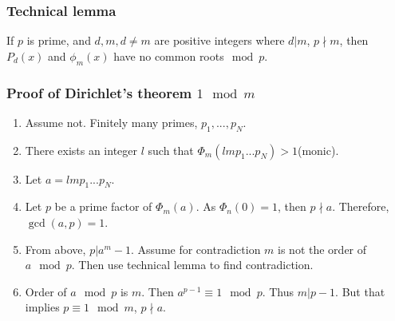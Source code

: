 \documentclass[]{beamer}
\begin{document}
\begin{frame}
	\frametitle{Technical lemma}
	If $p$ is prime, and $d, m, d \neq m$ are positive integers where $d | m$, $p \nmid m$, then $P_d(x)$ and $\phi_m(x)$ have no common roots$\mod p$. 
\end{frame}
\begin{frame}
	\frametitle{Proof of Dirichlet's theorem $1 \mod m$}
	\begin{enumerate}
		\item Assume not. Finitely many primes, $p_1, ..., p_N$.
		\item There exists an integer $l$ such that $\Phi_m(l m p_1 ... p_N) > 1$(monic).
		\item Let $a = l m p_1 ... p_N$. 
		\item Let $p$ be a prime factor of $\Phi_m(a)$. As $\Phi_n(0) = 1$, then $p \nmid a$. Therefore, $\gcd(a, p) = 1$.
		\item From above, $p | a^m - 1$. Assume for contradiction $m$ is not the order of $a \mod p$. Then use technical lemma to find contradiction.
		\item Order of $a \mod p$ is $m$. Then $a^{p-1} \equiv 1 \mod p$. Thus $m | p-1$. But that implies $ p \equiv 1 \mod m$, $p \nmid a$.
	\end{enumerate}
\end{frame}
\end{document}
